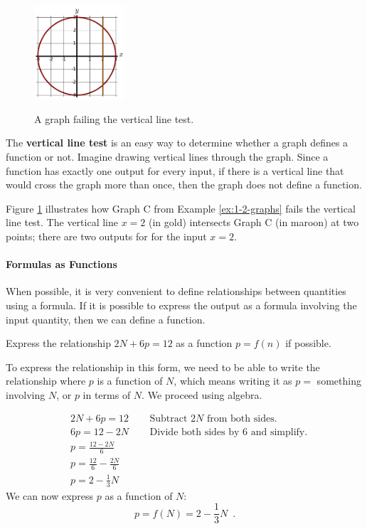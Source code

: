 \begin{figure}
    \centering
    \vspace{-12pt}
    \includegraphics[width=0.3\textwidth]{img/chap1/sec1-2/fig115.png}\\
    \caption{A graph failing the vertical line test.}
    \label{fig:1-2-115}
\end{figure}
The \textbf{vertical line test} is an easy way to determine whether a graph defines a function or not. Imagine drawing vertical lines through the graph. Since a function has exactly one output for every input, if there is a vertical line that would cross the graph more than once, then the graph does not define a function.

Figure \ref{fig:1-2-115} illustrates how Graph C from Example \ref{ex:1-2-graphs} fails the vertical line test. The vertical line $x=2$ (in gold) intersects Graph C (in maroon) at two points; there are two outputs for for the input $x=2$.

\paragraph{Formulas as Functions}

When possible, it is very convenient to define relationships between quantities using a formula. If it is possible to express the output as a formula involving the input quantity, then we can define a function.

\begin{example}
Express the relationship $2N + 6p = 12$ as a function $p = f(n)$ if possible.

\solution To express the relationship in this form, we need to be able to write
the relationship where $p$ is a function of $N$, which means
writing it as $p = $ something involving $N$, or $p$ in terms of $N$. We proceed using algebra.

\begin{align*}
&2N + 6p = 12&\enspace &\mbox{Subtract $2N$ from both sides.}\\
&6p = 12 - 2N&\enspace  &\mbox{Divide both sides by 6 and simplify.}\\
&p = \frac{12-2N}{6}& & \\
&p = \frac{12}{6} - \frac{2N}{6} & &\\
&p = 2 - \frac{1}{3}N & &
\end{align*}
We can now express $p$ as a function of $N$:
$$p = f(N) = 2 - \frac{1}{3}N \enspace .$$
\end{example}

